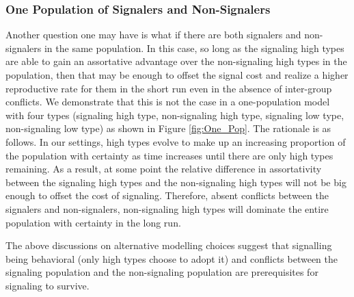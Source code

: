 \subsubsection{One Population of Signalers and Non-Signalers}
Another question one may have is what if there are both signalers and non-signalers in the same population. In this case, so long as the signaling high types are able to gain an assortative advantage over the non-signaling high types in the population, then that may be enough to offset the signal cost and realize a higher reproductive rate for them in the short run even in the absence of inter-group conflicts. We demonstrate that this is not the case in a one-population model with four types (signaling high type, non-signaling high type, signaling low type, non-signaling low type) as shown in Figure \ref{fig:One_Pop}. The rationale is as follows. In our settings, high types evolve to make up an increasing proportion of the population with certainty as time increases until there are only high types remaining. As a result, at some point the relative difference in assortativity between the signaling high types and the non-signaling high types will not be big enough to offset the cost of signaling. Therefore, absent conflicts between the signalers and non-signalers, non-signaling high types will dominate the entire population with certainty in the long run.

The above discussions on alternative modelling choices suggest that signalling being behavioral (only high types choose to adopt it) and conflicts between the signaling population and the non-signaling population  are prerequisites for signaling to survive.

